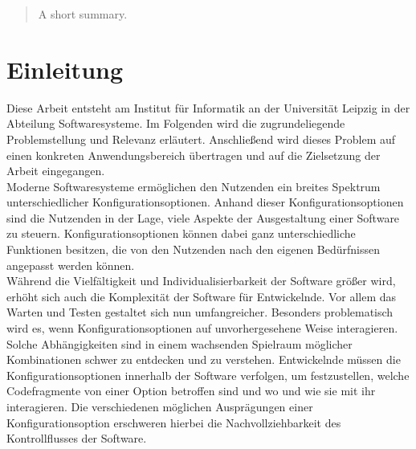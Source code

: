 \documentclass[german,bachelor]{swsLeipzig}
\begin{document}
\begin{frontmatter}
  \begin{abstract}
    A short summary.
  \end{abstract}

  \tableofcontents





\end{frontmatter}

\chapter{Einleitung}\label{Einleitung}
Diese Arbeit entsteht am Institut für Informatik an der Universit\"at Leipzig in der Abteilung \glqq Softwaresysteme\grqq.
Im Folgenden wird die zugrundeliegende Problemstellung und Relevanz erl\"autert.
Anschlie\ss end wird dieses Problem auf einen konkreten Anwendungsbereich \"ubertragen und auf die Zielsetzung der Arbeit eingegangen.\\

Moderne Softwaresysteme erm\"oglichen den Nutzenden ein breites Spektrum unterschiedlicher Konfigurationsoptionen.
Anhand dieser Konfigurationsoptionen sind die Nutzenden in der Lage, viele Aspekte der Ausgestaltung einer Software zu steuern.
Konfigurationsoptionen k\"onnen dabei ganz unterschiedliche Funktionen besitzen, die von den Nutzenden nach den eigenen Bed\"urfnissen angepasst werden k\"onnen.\\

W\"ahrend die Vielf\"altigkeit und Individualisierbarkeit der Software gr\"o\ss er wird, erh\"oht sich auch die Komplexit\"at der Software f\"ur Entwickelnde.
Vor allem das Warten und Testen gestaltet sich nun umfangreicher.
Besonders problematisch wird es, wenn Konfigurationsoptionen auf unvorhergesehene Weise interagieren.
Solche Abh\"angigkeiten sind in einem wachsenden Spielraum m\"oglicher Kombinationen schwer zu entdecken und zu verstehen.
Entwickelnde m\"ussen die Konfigurationsoptionen innerhalb der Software verfolgen, um festzustellen,
welche Codefragmente von einer Option betroffen sind und wo und wie sie mit ihr interagieren.
Die verschiedenen m\"oglichen Auspr\"agungen einer Konfigurationsoption erschweren hierbei die Nachvollziehbarkeit des Kontrollflusses der Software.\\
\end{document}
